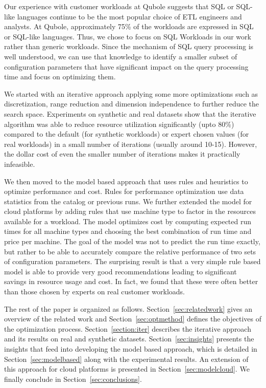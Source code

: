 Our experience with customer workloads at Qubole suggests that SQL or SQL-like languages continue to be the most popular choice of ETL engineers and analysts. At Qubole, approximately 75\% of the workloads are expressed in SQL or SQL-like languages. Thus, we chose to focus on SQL Workloads in our work rather than generic workloads. Since the mechanism of SQL query processing is well understood, we can use that knowledge to identify a smaller subset of configuration parameters that have significant impact on the query processing time and focus on optimizing them. 


We started with an iterative approach applying some more optimizations such as discretization, range reduction and dimension independence to further reduce the search space. Experiments on synthetic and real datasets show that the iterative algorithm was able to reduce resource utilization significantly (upto 80\%) compared to the default (for synthetic workloads) or expert chosen values (for real workloads) in a small number of iterations (usually around 10-15). However, the dollar cost of even the smaller number of iterations makes it practically infeasible.

We then moved to the model based approach that uses rules and heuristics to optimize performance and cost. Rules for performance optimization use data statistics from the catalog or previous runs. We further extended the model for cloud platforms by adding rules that use machine type to factor in the resources available for a workload. The model optimizes cost by computing expected run times for all machine types and choosing the best combination of run time and price per machine. The goal of the model was not to predict the run time exactly, but rather to be able to accurately compare the relative performance of two sets of configuration parameters. The surprising result is that a very simple rule based model is able to provide very good recommendations leading to significant savings in resource usage and cost. In fact, we found that these were often better than those chosen by experts on real customer workloads.

The rest of the paper is organized as follows. Section~\ref{sec:relatedwork} gives an overview of the related work and Section~\ref{sec:optmethod} defines the objectives of the optimization process. Section~\ref{section:iter} describes the iterative approach and its results on real and synthetic datasets. Section~\ref{sec:insights} presents the insights that feed into developing the model based approach, which is detailed in Section~\ref{sec:modelbased} along with the experimental results. An extension of this approach for cloud platforms is presented in Section~\ref{sec:modelcloud}. We finally conclude in Section~\ref{sec:conclusions}.

